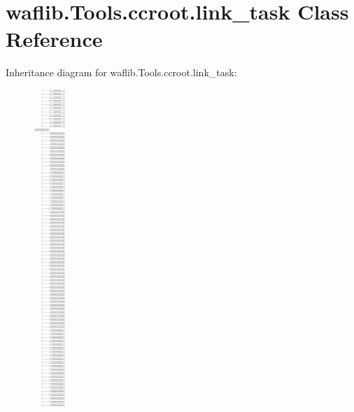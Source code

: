 \hypertarget{classwaflib_1_1_tools_1_1ccroot_1_1link__task}{}\section{waflib.\+Tools.\+ccroot.\+link\+\_\+task Class Reference}
\label{classwaflib_1_1_tools_1_1ccroot_1_1link__task}
Inheritance diagram for waflib.\+Tools.\+ccroot.\+link\+\_\+task\+:\begin{figure}[H]
\begin{center}
\leavevmode
\includegraphics[height=12.000000cm]{classwaflib_1_1_tools_1_1ccroot_1_1link__task}
\end{center}
\end{figure}
